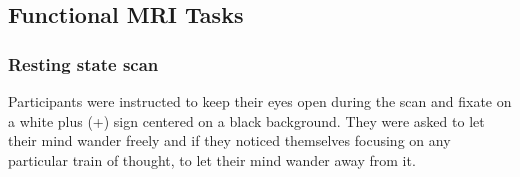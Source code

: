 \subsection{Functional MRI Tasks}

\subsubsection{Resting state scan}

Participants were instructed to keep their eyes open during the scan and fixate on a white plus (+) sign centered on a black background. They were asked to let their mind wander freely and if they noticed themselves focusing on any particular train of thought, to let their mind wander away from it.
